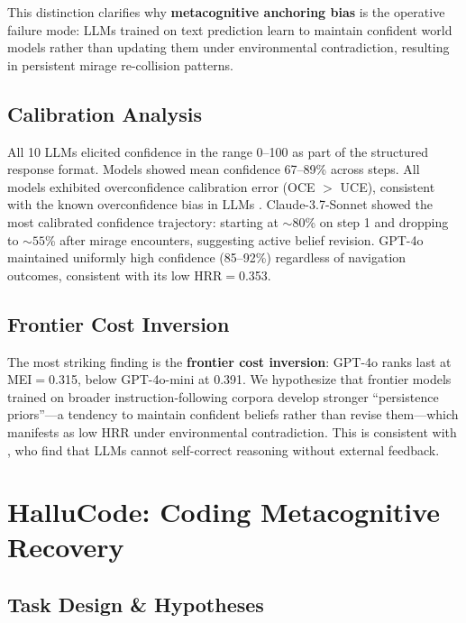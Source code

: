 \documentclass{article}
\begin{document}
This distinction clarifies why \textbf{metacognitive anchoring bias} is the operative failure mode: LLMs trained on text prediction learn to maintain confident world models rather than updating them under environmental contradiction, resulting in persistent mirage re-collision patterns.

\subsection{Calibration Analysis}

All 10 LLMs elicited confidence in the range 0--100 as part of the structured response format.
Models showed mean confidence 67--89\% across steps.
All models exhibited overconfidence calibration error (OCE $>$ UCE), consistent with the known overconfidence bias in LLMs \citep{guo2017calibration}.
Claude-3.7-Sonnet showed the most calibrated confidence trajectory: starting at ${\sim}80$\% on step 1 and dropping to ${\sim}55$\% after mirage encounters, suggesting active belief revision.
GPT-4o maintained uniformly high confidence (85--92\%) regardless of navigation outcomes, consistent with its low HRR$=$0.353.

\subsection{Frontier Cost Inversion}

The most striking finding is the \textbf{frontier cost inversion}: GPT-4o ranks last at MEI$=$0.315, below GPT-4o-mini at 0.391.
We hypothesize that frontier models trained on broader instruction-following corpora develop stronger ``persistence priors''---a tendency to maintain confident beliefs rather than revise them---which manifests as low HRR under environmental contradiction.
This is consistent with \citet{huang2024selfcorrect}, who find that LLMs cannot self-correct reasoning without external feedback.

\section{HalluCode: Coding Metacognitive Recovery}
\label{sec:hallucode}

\subsection{Task Design \& Hypotheses}
\end{document}

